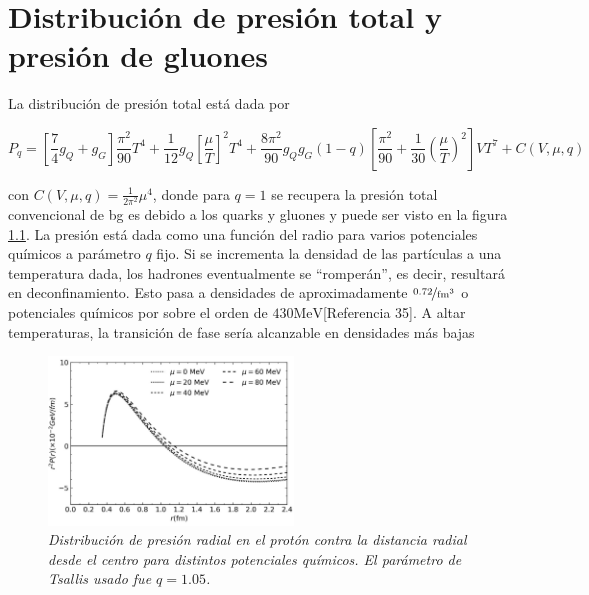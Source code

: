 \chapter{Distribución de presión total y presión de gluones}\label{ch: TotalPandGluons}

La distribución de presión total está dada por 

\begin{equation}
{P}_{q} =\left[\frac{7}{4}{g}_{Q} + {g}_{G} \right] \frac{{\pi}^{2}}{90}{T}^{4} + \frac{1}{12} {g}_{Q} \left[\frac{\mu}{T} \right]^{2} {T}^{4} + \frac{8{\pi}^{2}}{90} {g}_{Q}{g}_{G} \left(1-q\right) \left[\frac{{\pi}^{2}}{90} + \frac{1}{30} \left(\frac{\mu}{T} \right)^{2} \right]V{T}^{7} + C \left(V,\mu,q \right)
\end{equation}

con $C(V,\mu,q) = \frac{1}{2{\pi}^{2}}{\mu}^{4}$, donde para $q=1$ se recupera la presión total convencional de \acrshort{bg} es debido a los quarks y gluones y puede ser visto en la figura \ref{fig: Presión total en T-MIT bag model}. La presión está dada como una función del radio para varios potenciales químicos a parámetro $q$ fijo. Si se incrementa la densidad de las partículas a una temperatura dada, los hadrones eventualmente se ``romperán'', es decir, resultará en deconfinamiento. Esto pasa a densidades de aproximadamente $\nicefrac{0.72}{\mathrm{\unit{\femto\meter}}^{3}}$ o potenciales químicos por sobre el orden de $430 \mathrm{MeV}$[Referencia 35]. A altar temperaturas, la transición de fase sería alcanzable en densidades más bajas

\begin{figure}
\centering
\includegraphics[width=0.58\textwidth]{./Images/TotalPressureTsallis.png}
\caption[Presión total en el modelo T-MIT bag model]{\emph{Distribución de presión radial en el protón  contra la distancia radial desde el centro para distintos potenciales químicos. El parámetro de Tsallis usado fue $q=1.05$.}}
\label{fig: Presión total en T-MIT bag model}
\end{figure}

